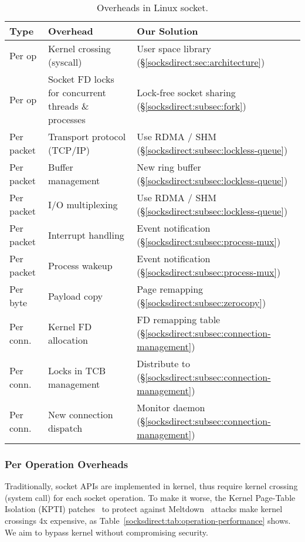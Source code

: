 \begin{table}[t]
	\centering
		\begin{tabularx}{1\textwidth}{l|X|X}
			\hline
			Type & Overhead & Our Solution \\
			\hline
			\hline
			Per op & Kernel crossing (syscall) & User space library (\S\ref{socksdirect:sec:architecture}) \\
			\hline
			Per op & Socket FD locks for concurrent threads \& processes & Lock-free socket sharing (\S\ref{socksdirect:subsec:fork}) \\
			\hline
			\hline
			Per packet & Transport protocol (TCP/IP) & Use RDMA / SHM (\S\ref{socksdirect:subsec:lockless-queue}) \\
			\hline
			Per packet & Buffer management & New ring buffer (\S\ref{socksdirect:subsec:lockless-queue}) \\
			\hline
			Per packet & I/O multiplexing & Use RDMA / SHM (\S\ref{socksdirect:subsec:lockless-queue}) \\
			\hline
			Per packet & Interrupt handling & Event notification (\S\ref{socksdirect:subsec:process-mux}) \\
			\hline
			Per packet & Process wakeup & Event notification (\S\ref{socksdirect:subsec:process-mux}) \\
			\hline
			\hline
			Per byte & Payload copy & Page remapping (\S\ref{socksdirect:subsec:zerocopy}) \\
			\hline
			\hline
			Per conn. & Kernel FD allocation & FD remapping table (\S\ref{socksdirect:subsec:connection-management}) \\
			\hline
			Per conn. & Locks in TCB management & Distribute to \libipc{} (\S\ref{socksdirect:subsec:connection-management}) \\
			\hline
			Per conn. & New connection dispatch & Monitor daemon (\S\ref{socksdirect:subsec:connection-management}) \\
			\hline
		\end{tabularx}
	\caption{Overheads in Linux socket.}
	\label{socksdirect:tab:overhead}
	
\end{table}

\subsubsection{Per Operation Overheads}
\label{socksdirect:subsec:per-operation-overhead}
\quad

Traditionally, socket APIs are implemented in kernel, thus require kernel crossing (system call) for each socket operation. To make it worse, the Kernel Page-Table Isolation (KPTI) patches~\cite{kpti} to protect against Meltdown~\cite{Lipp2018meltdown} attacks make kernel crossings 4x expensive, as Table~\ref{socksdirect:tab:operation-performance} shows.
We aim to bypass kernel without compromising security.


